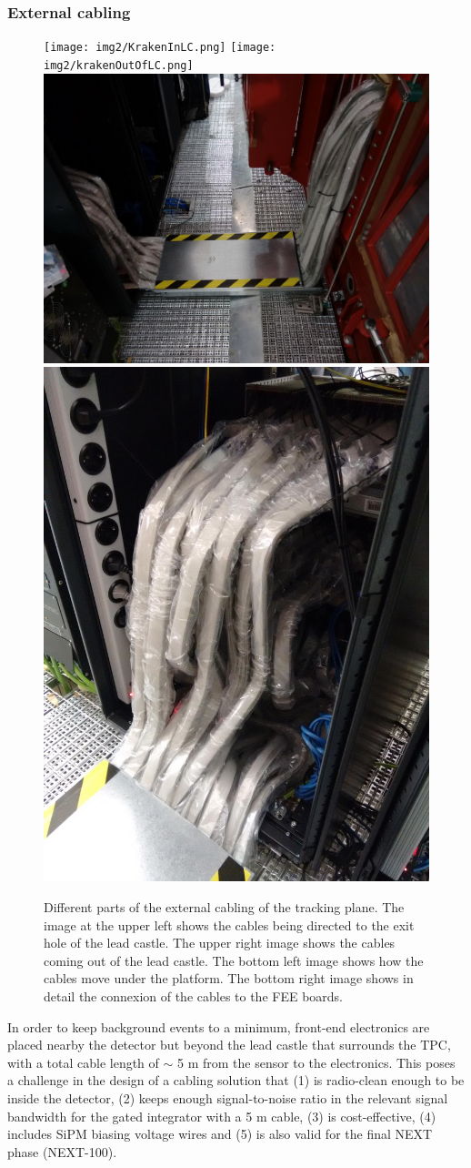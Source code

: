 \subsubsection*{External cabling}\label{sec:ext}


\begin{figure}[hpt!]
\centering
\texttt{[image: img2/KrakenInLC.png]}
\texttt{[image: img2/krakenOutOfLC.png]}
\includegraphics[width=.45\textwidth]{img2/cabling_under_platform.png}
\includegraphics[width=.45\textwidth]{img2/cabling2FEE.png}
\caption{Different parts of the external cabling of the tracking plane. The image at the upper left shows the cables being directed to the exit hole of the lead castle. The upper right image shows the cables coming out of the lead castle. The bottom left image shows how the cables move under the platform. The bottom right image shows in detail the connexion of the cables to the FEE boards.}
\label{fig:external_installation}
\end{figure}

In order to keep background events to a minimum, front-end electronics are placed nearby the detector but beyond the lead castle that surrounds the TPC, with a total cable length of $\sim$ 5 m from the sensor to the electronics. This poses a challenge in the design of a cabling solution that (1) is radio-clean enough to be inside the detector, (2) keeps enough signal-to-noise ratio in the relevant signal bandwidth for the gated integrator with a 5 m cable, (3) is cost-effective, (4) includes SiPM biasing voltage wires and (5) is also valid for the final NEXT phase (NEXT-100).

